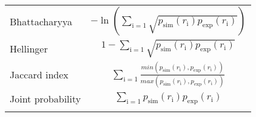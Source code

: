 \begin{center}
\begin{tabular}{l c}
Bhattacharyya & $- \ln \left( \sum_{\mathup{i}=1} \sqrt{ p_{\mathup{sim}} \left( r_{\mathup{i}} \right) p_{\mathup{exp}} \left( r_{\mathup{i}} \right)}  \right)$ \\
Hellinger & $1 - \sum_{\mathup{i}=1} \sqrt{ p_{\mathup{sim}} \left( r_{\mathup{i}} \right) p_{\mathup{exp}} \left( r_{\mathup{i}} \right)} $\\
Jaccard index & $\sum_{\mathup{i}=1} \frac{ min \left( p_{\mathup{sim}} \left( r_{\mathup{i}} \right), p_{\mathup{exp}} \left( r_{\mathup{i}} \right) \right) } { max \left( p_{\mathup{sim}} \left( r_{\mathup{i}} \right), p_{\mathup{exp}} \left( r_{\mathup{i}} \right) \right)}$ \\
Joint probability & $\sum_{\mathup{i}=1} p_{\mathup{sim}} \left( r_{\mathup{i}} \right) p_{\mathup{exp}} \left( r_{\mathup{i}} \right)$ \\
\bottomrule \\
\end{tabular} 
\end{center}



